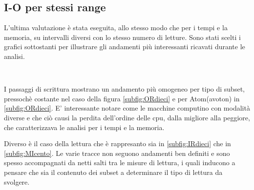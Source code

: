 \subsection{I-O per stessi range}
L'ultima valutazione è stata eseguita, allo stesso modo che per i tempi e la memoria,  su intervalli diversi con lo stesso numero di letture.
Sono stati scelti i grafici sottostanti per illustrare gli andamenti più interessanti ricavati durante le analisi.
\begin{figure}[H]
\centering
{} \quad
{} \\
\end{figure}
\begin{figure}[H]
\ContinuedFloat
\centering
{} \quad
\centering
{} 
\caption{}
\label{fig:IOrng}
\end{figure}

I passaggi di scrittura mostrano un andamento più omogeneo per tipo di subset, pressochè costante nel caso della figura \ref{subfig:ORdieci} e per Atom(avoton) in \ref{subfig:ORdieci}.
E' interessante notare come le macchine computino con modalità diverse e che ciò causi la perdita dell'ordine delle cpu, dalla migliore alla peggiore, che caratterizzava le analisi per i tempi e la memoria.  

Diverso è il caso della lettura che è rappresanto sia in \ref{subfig:IRdieci} che in \ref{subfig:MIcento}.  
Le varie tracce non seguono andamenti ben definiti e sono spesso accompagnati da netti salti tra le misure di lettura, i quali inducono a pensare che sia il contenuto dei subset a determinare il tipo di lettura da svolgere. 
